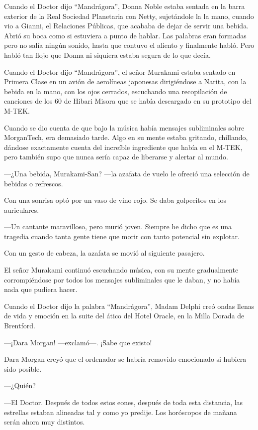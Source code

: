 Cuando el Doctor dijo ``Mandrágora'', Donna Noble estaba sentada en la
barra exterior de la Real Sociedad Planetaria con Netty, sujetándole la
la mano, cuando vio a Gianni, el Relaciones Públicas, que acababa de
dejar de servir una bebida. Abrió su boca como si estuviera a punto de
hablar. Las palabras eran formadas pero no salía ningún sonido, hasta
que contuvo el aliento y finalmente habló. Pero habló tan flojo que
Donna ni siquiera estaba segura de lo que decía.

Cuando el Doctor dijo ``Mandrágora'', el señor Murakami estaba sentado
en Primera Clase en un avión de aerolíneas japonesas dirigiéndose a
Narita, con la bebida en la mano, con los ojos cerrados, escuchando una
recopilación de canciones de los 60 de Hibari Misora que se había
descargado en su prototipo del M-TEK.

Cuando se dio cuenta de que bajo la música había mensajes subliminales
sobre MorganTech, era demasiado tarde. Algo en su mente estaba gritando,
chillando, dándose exactamente cuenta del increíble ingrediente que
había en el M-TEK, pero también supo que nunca sería capaz de liberarse
y alertar al mundo.

---¿Una bebida, Murakami-San? ---la azafata de vuelo le ofreció una
selección de bebidas o refrescos.

Con una sonrisa optó por un vaso de vino rojo. Se daba golpecitos en los
auriculares.

---Un cantante maravilloso, pero murió joven. Siempre he dicho que es
una tragedia cuando tanta gente tiene que morir con tanto potencial sin
explotar.

Con un gesto de cabeza, la azafata se movió al siguiente pasajero.

El señor Murakami continuó escuchando música, con su mente gradualmente
corrompiéndose por todos los mensajes subliminales que le daban, y no
había nada que pudiera hacer.

Cuando el Doctor dijo la palabra ``Mandrágora'', Madam Delphi creó ondas
llenas de vida y emoción en la suite del ático del Hotel Oracle, en la
Milla Dorada de Brentford.

---¡Dara Morgan! ---exclamó---. ¡Sabe que existo!

Dara Morgan creyó que el ordenador se habría removido emocionado si
hubiera sido posible.

---¿Quién?

---El Doctor. Después de todos estos eones, después de toda esta
distancia, las estrellas estaban alineadas tal y como yo predije. Los
horóscopos de mañana serán ahora muy distintos.

